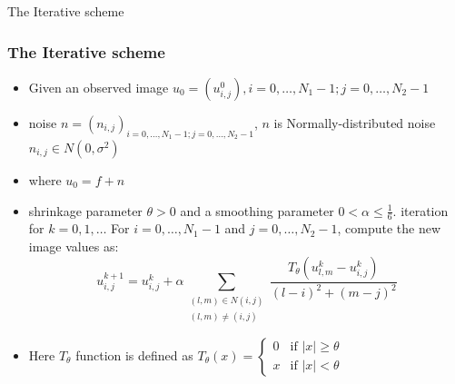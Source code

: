 \documentclass{beamer}
\begin{document}
\begin{frame}{The Iterative scheme}
\frametitle{The Iterative scheme}
    \begin{itemize}
        \item Given an observed image $u_0 = (u^0_{i,j}),{i=0,\ldots,N_1-1;j=0,\ldots,N_2-1}$
        
        \item noise $n = (n_{i,j})_{i=0,\ldots,N_1-1;j=0,\ldots,N_2-1}$,  $n$ is Normally-distributed noise $n_{i,j} \in N(0, \sigma^2)$
        
        \item  where $u_0 = f + n$
        \item shrinkage parameter $\theta > 0$ and a smoothing parameter $0 < \alpha \leq \frac{1}{6}$.
        \itemm iteration for $k = 0, 1, \ldots$ For $i = 0, \ldots, N_1 - 1$ and $j = 0, \ldots, N_2 - 1$, compute the new image values as:
	\begin{equation}
		u_{i,j}^{k+1} = u_{i,j}^k + \alpha\sum_{\substack{(l,m)\in N(i,j)\\(l,m)\neq (i,j)}} \frac{T_{\theta}(u_{l,m}^k - u_{i,j}^k)}{(l-i)^2 + (m-j)^2} \label{eq:1}
	\end{equation}
        \item 	Here $T_\theta$ function is defined as 
	$T_{\theta}(x) = \begin{cases}
		0 & \text{if } |x| \geq \theta \\
		x & \text{if } |x| < \theta
	\end{cases}$
    \end{itemize}
\end{frame}
\end{document}
